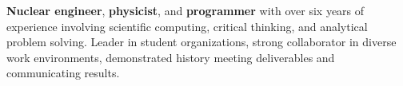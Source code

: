 

\begin{minipage}{0.68\textwidth}
\begin{justify}
	{\normalsize
	\textbf{Nuclear engineer}, \textbf{physicist}, and \textbf{programmer} with over six years of experience involving scientific computing, critical thinking, and analytical problem solving.
	Leader in student organizations, strong collaborator in diverse work environments, demonstrated history meeting deliverables and communicating results.

	}
\end{justify}
\end{minipage}%
\hspace{4mm}
\begin{minipage}{0.28\textwidth}
\end{minipage}
